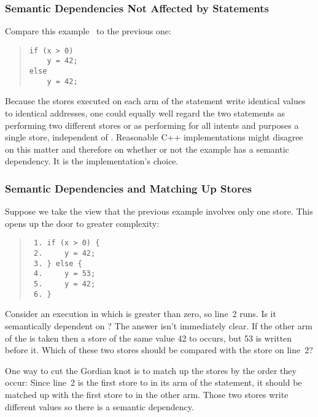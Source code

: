 \subsubsection{Semantic Dependencies Not Affected by  Statements}
\label{sec:Semantic Dependencies Not Affected by if Statements}

Compare this example~\cite{Howells2009membartxt} to the previous one:
\begin{quote}
\begin{verbatim}
if (x > 0)
    y = 42;
else
    y = 42;
\end{verbatim}
\end{quote}
Because the stores executed on each arm of the  statement write
identical values to identical addresses, one could equally well regard
the two statements as performing two different stores or as performing
for all intents and purposes a single store, independent of .
Reasonable C++ implementations might disagree on this matter and
therefore on whether or not the example has a semantic dependency.
It is the implementation's choice.

\subsubsection{Semantic Dependencies and Matching Up Stores}
\label{sec:Semantic Dependencies and Matching Up Stores}

Suppose we take the view that the previous example involves only one
store.
This opens up the door to greater complexity:
\begin{quote}
\begin{verbatim}
 1. if (x > 0) {
 2.     y = 42;
 3. } else {
 4.     y = 53;
 5.     y = 42;
 6. }
\end{verbatim}
\end{quote}
Consider an execution in which  is greater than zero, so line~2
runs.
Is it semantically dependent on ?
The answer isn't immediately clear.
If the other arm of the  is taken then a store of the same value 42 to
 occurs, but 53 is written before it.
Which of these two stores should be compared with the store on line~2?

One way to cut the Gordian knot is to match up the stores by the order
they occur:
Since line~2 is the first store to  in its arm of the 
statement, it should be matched up with the first store to  in
the other arm.
Those two stores write different values so there is a semantic
dependency.

